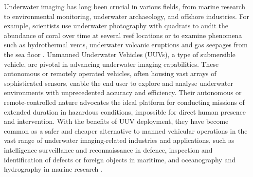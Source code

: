 Underwater imaging has long been crucial in various fields, from marine research to environmental monitoring, underwater archaeology, and offshore industries. For example, scientists use underwater photography with quadrats to audit the abundance of coral over time at several reef locations or to examine phenomena such as hydrothermal vents, underwater volcanic eruptions and gas seepages from the sea floor \cite{universityofhawaiiPracticesScienceUnderwater}. Unmanned Underwater Vehicles (UUVs), a type of submersible vehicle, are pivotal in advancing underwater imaging capabilities. These autonomous or remotely operated vehicles, often housing vast arrays of sophisticated sensors, enable the end user to explore and analyse underwater environments with unprecedented accuracy and efficiency. Their autonomous or remote-controlled nature advocates the ideal platform for conducting missions of extended duration in hazardous conditions, impossible for direct human presence and intervention. With the benefits of UUV deployment, they have become common as a safer and cheaper alternative to manned vehicular operations in the vast range of underwater imaging-related industries and applications, such as intelligence surveillance and reconnaissance in defence, inspection and identification of defects or foreign objects in maritime, and oceanography and hydrography in marine research \cite{yannickallardUnmannedUnderwaterVehicle2014}.


